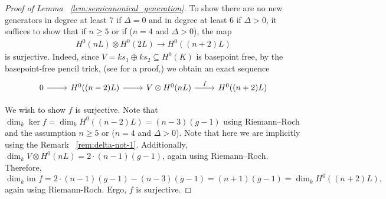 \documentclass{amsart}
\theoremstyle{plain}
\theoremstyle{definition}
\theoremstyle{remark}
\numberwithin{equation}{section}
\newcommand\im{\text{im }}
\begin{document}
\begin{proof}[Proof of Lemma ~\ref{lem:semicanonical_generation}]
To show there are no new generators in degree at least $7$ if $\Delta = 0$ and in degree at least $6$ if $\Delta > 0$, it suffices to show that if $n \geq 5$ or if ($n = 4$ and $\Delta > 0$), the map
\begin{align*}
	H^0(nL) \otimes H^0(2L) \rightarrow H^0((n+2)L)
\end{align*}
is surjective. Indeed, since $V= ks_1 \oplus k s_2 \subseteq H^0(K)$ is basepoint free, by the basepoint-free pencil trick, (see \cite[Lemma 2.6]{saint-donat:proj} for a proof,) we obtain an exact sequence
$$\begin{tikzcd}
0 \ar r & H^0((n-2)L) \ar r & V \otimes H^0(nL) \ar{r}{f} & H^0((n+2)L)
\end{tikzcd}$$


We wish to show $f$ is surjective.
Note that $\dim_k \ker f = \dim_k H^0((n-2)L) = (n-3)(g - 1)$ using Riemann--Roch and the assumption $n \geq 5$ or ($n = 4$ and $\Delta > 0$). Note that here we are implicitly using the Remark ~\ref{rem:delta-not-1}.
Additionally, $\dim_k V \otimes H^0(nL) = 2 \cdot (n- 1)(g - 1)$, again using Riemann--Roch.
Therefore, $$\dim_k \im f = 2 \cdot (n- 1)(g - 1) -(n-3)(g - 1) = (n+ 1)(g - 1) = \dim_k H^0((n+2)L),$$
again using Riemann-Roch. Ergo, $f$ is surjective.
\end{proof}
\end{document}
